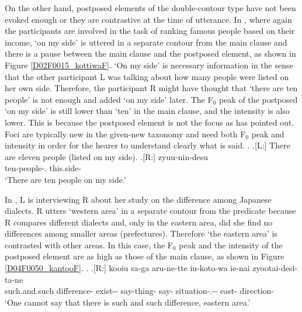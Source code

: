 On the other hand,
postposed elements of the double-contour type have not been evoked enough or they are contrastive at the time of utterance.
In \Next, where again the participants are involved in the task of ranking famous people based on their income,
 `on my side' is uttered in a separate contour from the main clause and there is a pause between the main clause and the postposed element, as shown in Figure \ref{D02F0015_kottiwaF}.
`On my side' is necessary information in the sense that
the other participant L was talking about how many people were listed on her own side.
Therefore, the participant R might have thought that `there are ten people' is not enough and added `on my side' later.
The F$_{0}$ peak of the postposed  `on my side' is still lower than  `ten' in the main clause,
and the intensity is also lower.
This is because the postposed element is not the focus as  has pointed out.
Foci are typically new in the given-new taxonomy and need both F$_{0}$ peak and intensity in order for the hearer to understand clearly what is said.
%
\ex.\label{D02F0015_kottiwa}
 \a.[L:] There are eleven people (listed on my side).
 \bg.[R:] zyuu-nin-desu  \\
 		ten-people-. this.side- \\
		`There are ten people on my side.'


In \Next,
L is interviewing R about her study on the difference among Japanese dialects.
R utters `western area' in a separate contour from the predicate
because R compares different dialects and, only in the eastern area, did she find no differences among smaller areas (prefectures).
Therefore `the eastern area' is contrasted with other areas.
In this case, the F$_{0}$ peak and the intensity of the postposed element are as high as those of the main clause,
as shown in Figure \ref{D04F0050_kantooF}.
%
\ex.\label{D04F0050_kantoo}
 \ag.[R:] kooiu sa-ga aru-ne-tte iu-koto-wa ie-nai zyootai-desi-ta-ne   \\
 	such.and.such difference- exist-- say-thing- say- situation-.-- east- direction- \\
	`One cannot say that there is such and such difference, eastern area.'

